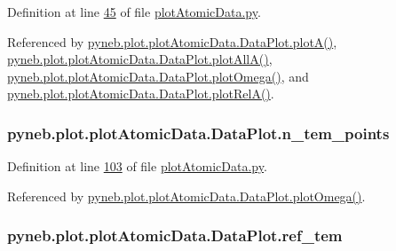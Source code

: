 Definition at line \hyperlink{plot_atomic_data_8py_source_l00045}{45} of file \hyperlink{plot_atomic_data_8py_source}{plot\+Atomic\+Data.\+py}.



Referenced by \hyperlink{plot_atomic_data_8py_source_l00116}{pyneb.\+plot.\+plot\+Atomic\+Data.\+Data\+Plot.\+plot\+A()}, \hyperlink{plot_atomic_data_8py_source_l00188}{pyneb.\+plot.\+plot\+Atomic\+Data.\+Data\+Plot.\+plot\+All\+A()}, \hyperlink{plot_atomic_data_8py_source_l00372}{pyneb.\+plot.\+plot\+Atomic\+Data.\+Data\+Plot.\+plot\+Omega()}, and \hyperlink{plot_atomic_data_8py_source_l00261}{pyneb.\+plot.\+plot\+Atomic\+Data.\+Data\+Plot.\+plot\+Rel\+A()}.

\hypertarget{classpyneb_1_1plot_1_1plot_atomic_data_1_1_data_plot_a9f92ae121756c0e3d3624f11e3d2ae17}{}
\subsubsection[{n\+\_\+tem\+\_\+points}]{\setlength{\rightskip}{0pt plus 5cm}pyneb.\+plot.\+plot\+Atomic\+Data.\+Data\+Plot.\+n\+\_\+tem\+\_\+points}\label{classpyneb_1_1plot_1_1plot_atomic_data_1_1_data_plot_a9f92ae121756c0e3d3624f11e3d2ae17}


Definition at line \hyperlink{plot_atomic_data_8py_source_l00103}{103} of file \hyperlink{plot_atomic_data_8py_source}{plot\+Atomic\+Data.\+py}.



Referenced by \hyperlink{plot_atomic_data_8py_source_l00372}{pyneb.\+plot.\+plot\+Atomic\+Data.\+Data\+Plot.\+plot\+Omega()}.

\hypertarget{classpyneb_1_1plot_1_1plot_atomic_data_1_1_data_plot_aa260990b7c3556dc48741f6ae9516894}{}
\subsubsection[{ref\+\_\+tem}]{\setlength{\rightskip}{0pt plus 5cm}pyneb.\+plot.\+plot\+Atomic\+Data.\+Data\+Plot.\+ref\+\_\+tem}\label{classpyneb_1_1plot_1_1plot_atomic_data_1_1_data_plot_aa260990b7c3556dc48741f6ae9516894}



